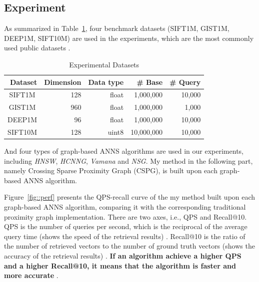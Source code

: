 \documentclass[UTF8]{article}
\begin{document}
\subsection{Experiment}
As summarized in Table~\ref{tab::dataset}, four benchmark datasets (SIFT1M, GIST1M, DEEP1M, SIFT10M) are used in the experiments, 
which are the most commonly used public datasets \cite{wang2021comprehensive}.

\vspace{-5mm}


\begin{table}[ht] 
  \caption{Experimental Datasets} \label{tab::dataset}
  \centering
  \small
  \renewcommand{\arraystretch}{1.5}
  \setlength{\tabcolsep}{6mm}
  \begin{tabular}{crrrr}
  \hline
  \multicolumn{1}{r}{\textbf{Dataset}} & \textbf{Dimension} & \textbf{Data type} & \textbf{\# Base} & \textbf{\# Query} \\ \hline
  SIFT1M                        & 128                & float             & 1,000,000       & 10,000           \\ 
  GIST1M                        & 960                & float             & 1,000,000       & 1,000            \\ 
  DEEP1M                        & 96                 & float             & 1,000,000       & 10,000           \\ 
  SIFT10M                       & 128                & uint8             & 10,000,000      & 10,000           \\ \hline
  \end{tabular}
\end{table}




And four types of graph-based ANNS algorithms are used in our experiments, 
including \textit{HNSW}, \textit{HCNNG}, \textit{Vamana} and \textit{NSG}.
My method in the following part, namely Crossing Sparse Proximity Graph (CSPG), is built upon each graph-based ANNS algorithm.

Figure~\ref{fig::perf} presents the QPS-recall curve of the my method built upon each graph-based ANNS
algorithm, comparing it with the corresponding traditional proximity graph implementation. 
There are two axes, i.e., QPS and Recall@10. 
QPS is the number of queries per second, 
which is the reciprocal of the average query time (shows the speed of the retrieval results) \cite{aumuller_ann-benchmarks_2020}. 
Recall@10 is the ratio of the number of retrieved vectors
to the number of ground truth vectors (shows the accuracy of the retrieval results) \cite{zhu2019accelerating}.
\textbf{If an algorithm achieve a higher QPS and a higher Recall@10, it means that the algorithm is faster and more accurate} 
\cite{kosuge2019object}.
\end{document}

